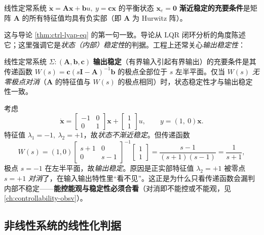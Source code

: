 \begin{theorem}[线性定常系统稳定判据]\label{thm:lyap-linear-eig}
线性定常系统 $\dot{\mathbf{x}}=\mathbf{A}\mathbf{x}+\mathbf{b}u,\ y=\mathbf{c}\mathbf{x}$ 的平衡状态 $\mathbf{x}_e=\mathbf{0}$ \textbf{渐近稳定的充要条件}是矩阵 $\mathbf{A}$ 的所有特征值均具有负实部（即 $\mathbf{A}$ 为 Hurwitz 阵）。
\end{theorem}

\noindent 这与导论 \cref{thm:ctrl-lyap-eq} 的第一句一致。导论从 LQR 闭环分析的角度陈述它；这里强调它是\emph{状态（内部）稳定性}的判据。工程上还常关心\emph{输出稳定性}：

\begin{proposition}[输出稳定与零极点对消]\label{prop:output-stable}
线性定常系统 $\Sigma:(\mathbf{A},\mathbf{b},\mathbf{c})$ \textbf{输出稳定}（有界输入引起有界输出）的充要条件是其传递函数 $W(s)=\mathbf{c}(s\mathbf{I}-\mathbf{A})^{-1}\mathbf{b}$ 的极点全部位于 $s$ 左半平面。仅当 $W(s)$ \emph{无零极点对消}（$\mathbf{A}$ 的特征值与 $W(s)$ 的极点相同）时，状态稳定性才与输出稳定性一致。
\end{proposition}

\begin{insight}
考虑
\[
  \dot{\mathbf{x}}=\begin{bmatrix}-1&0\\0&1\end{bmatrix}\mathbf{x}+\begin{bmatrix}1\\1\end{bmatrix}u,\qquad y=(1,\ 0)\mathbf{x}.
\]
特征值 $\lambda_1=-1,\ \lambda_2=+1$，故\emph{状态不渐近稳定}。但传递函数
\[
  W(s)=(1,0)\begin{bmatrix}s+1&0\\0&s-1\end{bmatrix}^{-1}\!\begin{bmatrix}1\\1\end{bmatrix}=\frac{s-1}{(s+1)(s-1)}=\frac{1}{s+1},
\]
极点 $s=-1$ 在左半平面，故\emph{输出稳定}。原因是正实部特征值 $\lambda_2=+1$ 被零点 $s=+1$ \emph{对消}了，在输入输出特性里“看不见”。这正是为什么只看传递函数会漏判内部不稳定——\textbf{能控能观与稳定性必须合看}（对消即不能控或不能观，见 \cref{ch:controllability-obsv}）。
\end{insight}

\subsection{非线性系统的线性化判据}
\label{sec:lyap-first-nonlinear}

